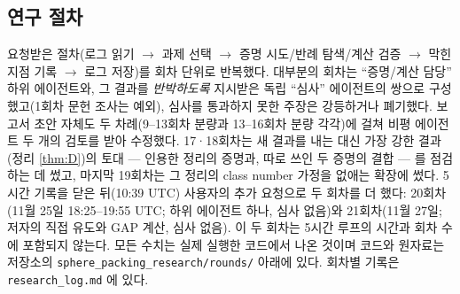 \subsection{연구 절차}
요청받은 절차(로그 읽기 $\to$ 과제 선택 $\to$ 증명 시도/반례 탐색/계산 검증 $\to$ 막힌 지점 기록 $\to$ 로그 저장)를 회차 단위로 반복했다. 대부분의 회차는 ``증명/계산 담당'' 하위 에이전트와, 그 결과를 \emph{반박하도록} 지시받은 독립 ``심사'' 에이전트의 쌍으로 구성했고(1회차 문헌 조사는 예외), 심사를 통과하지 못한 주장은 강등하거나 폐기했다. 보고서 초안 자체도 두 차례(9--13회차 분량과 13--16회차 분량 각각)에 걸쳐 비평 에이전트 두 개의 검토를 받아 수정했다. 17·18회차는 새 결과를 내는 대신 가장 강한 결과(정리 \ref{thm:D})의 토대 --- 인용한 정리의 증명과, 따로 쓰인 두 증명의 결합 --- 를 점검하는 데 썼고, 마지막 19회차는 그 정리의 class number 가정을 없애는 확장에 썼다. 5시간 기록을 닫은 뒤(10:39 UTC) 사용자의 추가 요청으로 두 회차를 더 했다: 20회차(11월 25일 18:25--19:55 UTC; 하위 에이전트 하나, 심사 없음)와 21회차(11월 27일; 저자의 직접 유도와 GAP 계산, 심사 없음). 이 두 회차는 5시간 루프의 시간과 회차 수에 포함되지 않는다. 모든 수치는 실제 실행한 코드에서 나온 것이며 코드와 원자료는 저장소의 \texttt{sphere\_packing\_research/rounds/} 아래에 있다. 회차별 기록은 \texttt{research\_log.md} 에 있다.
